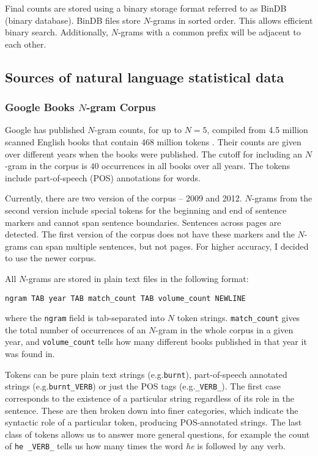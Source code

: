 \documentclass[draft]{IIBproject}
\makeatletter
\DeclareRobustCommand*{\eg}{e.g.\@\xspace}
\makeatother
\begin{document}
Final counts are stored using a binary storage format referred to as BinDB (binary database). BinDB files store $N$-grams in sorted order. This allows efficient binary search. Additionally, $N$-grams with a common prefix will be adjacent to each other.

\FloatBarrier
\subsection{Sources of natural language statistical data}

\subsubsection{Google Books $N$-gram Corpus}
\label{sec:google_books}

Google has published $N$-gram counts, for up to $N=5$, compiled from 4.5 million scanned English books that contain 468 million tokens \cite{googlengrams2011, lin2012paper}. Their counts are given over different years when the books were published. The cutoff for including an $N$-gram in the corpus is $40$ occurrences in all books over all years. The tokens include part-of-speech (POS) annotations for words.

Currently, there are two version of the corpus -- 2009 and 2012. $N$-grams from the second version include special tokens for the beginning and end of sentence markers and cannot span sentence boundaries. Sentences across pages are detected. The first version of the corpus does not have these markers and the $N$-grams can span multiple sentences, but not pages. For higher accuracy, I decided to use the newer corpus.

All $N$-grams are stored in plain text files in the following format:

\centerline{\texttt{ngram TAB year TAB match\_count TAB volume\_count NEWLINE}}

where the \texttt{ngram} field is tab-separated into $N$ token strings. \texttt{match\_count} gives the total number of occurrences of an $N$-gram in the whole corpus in a given year, and \texttt{volume\_count} tells how many different books published in that year it was found in.

Tokens can be pure plain text strings (\eg \texttt{burnt}), part-of-speech annotated strings (\eg \texttt{burnt\_VERB}) or just the POS tags (\eg \texttt{\_VERB\_}). The first case corresponds to the existence of a particular string regardless of its role in the sentence. These are then broken down into finer categories, which indicate the syntactic role of a particular token, producing POS-annotated strings. The last class of tokens allows us to answer more general questions, for example the count of \mbox{\texttt{he \_VERB\_}} tells us how many times the word \emph{he} is followed by any verb.
\end{document}
